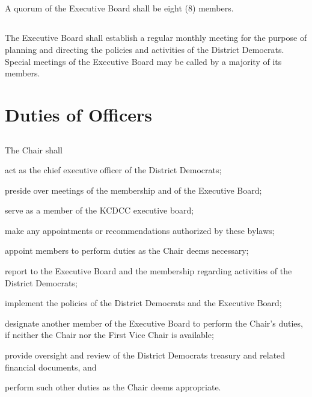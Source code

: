 \subsection{}
A quorum of the Executive Board shall be eight (8) members.

\subsection{}
The Executive Board shall establish a regular monthly meeting for the purpose of planning and directing the policies and activities of the \fortythird{} District Democrats. Special meetings of the Executive Board may be called by a majority of its members.

\section{Duties of Officers}
\subsection{}
The Chair shall
\begin{inlinealphalist}
    \item act as the chief executive officer of the \fortythird{} District Democrats;
    \item preside over meetings of the membership and of the Executive Board;
    \item serve as a member of the KCDCC executive board;
    \item make any appointments or recommendations authorized by these bylaws;
    \item appoint members to perform duties as the Chair deems necessary;
    \item report to the Executive Board and the membership regarding activities of the \fortythird{} District Democrats;
    \item implement the policies of the \fortythird{} District Democrats and the Executive Board;
    \item designate another member of the Executive Board to perform the Chair’s duties, if neither the Chair nor the First Vice Chair is available;
    \item provide oversight and review of the \fortythird{} District Democrats treasury and related financial documents, and
    \item perform such other duties as the Chair deems appropriate.
\end{inlinealphalist}

